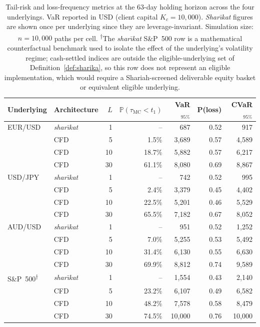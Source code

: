 \documentclass[preprint,12pt,authoryear]{elsarticle}
\newcommand{\PP}{\mathbb{P}}
\theoremstyle{definition}
\begin{document}
\begin{table}[!ht]
\centering
\small
\caption{Tail-risk and loss-frequency metrics at the 63-day
holding horizon across the four underlyings. VaR reported in USD
(client capital $K_c = 10{,}000$). \emph{Shar\={\i}kat} figures
are shown once per underlying since they are leverage-invariant.
Simulation size: $n = 10{,}000$ paths per cell.
\textsuperscript{$\dagger$}The \emph{shar\={\i}kat} S\&P~500 row
is a mathematical counterfactual benchmark used to isolate the
effect of the underlying's volatility regime; cash-settled
indices are outside the eligible-underlying set of
Definition~\ref{def:sharika}, so this row does not represent an
eligible implementation, which would require a
Shariah-screened deliverable equity basket or equivalent
eligible underlying.}
\label{tab:tail-metrics}
\begin{tabular}{@{}llrrrrr@{}}
\toprule
\textbf{Underlying}
    & \textbf{Architecture}
    & $L$
    & $\PP(\tau_{\text{MC}} < t_1)$
    & VaR$_{95\%}$
    & P(loss)
    & CVaR$_{95\%}$ \\
\midrule
EUR/USD & \emph{shar\={\i}kat} & 1  & --      & 687   & 0.52 & 917 \\
        & CFD                  & 5  & 1.5\%   & 3{,}689 & 0.57 & 4{,}589 \\
        & CFD                  & 10 & 18.7\%  & 5{,}882 & 0.57 & 6{,}217 \\
        & CFD                  & 30 & 61.1\%  & 8{,}080 & 0.69 & 8{,}867 \\[3pt]
USD/JPY & \emph{shar\={\i}kat} & 1  & --      & 742   & 0.52 & 995 \\
        & CFD                  & 5  & 2.4\%   & 3{,}379 & 0.45 & 4{,}402 \\
        & CFD                  & 10 & 22.5\%  & 5{,}201 & 0.46 & 5{,}529 \\
        & CFD                  & 30 & 65.5\%  & 7{,}182 & 0.67 & 8{,}052 \\[3pt]
AUD/USD & \emph{shar\={\i}kat} & 1  & --      & 951   & 0.52 & 1{,}252 \\
        & CFD                  & 5  & 7.0\%   & 5{,}255 & 0.53 & 5{,}492 \\
        & CFD                  & 10 & 31.4\%  & 6{,}130 & 0.55 & 6{,}630 \\
        & CFD                  & 30 & 69.9\%  & 8{,}812 & 0.74 & 9{,}589 \\[3pt]
S\&P~500\textsuperscript{$\dagger$} & \emph{shar\={\i}kat} & 1  & --     & 1{,}554 & 0.43 & 2{,}140 \\
         & CFD                 & 5  & 23.2\% & 6{,}107 & 0.49 & 6{,}582 \\
         & CFD                 & 10 & 48.2\% & 7{,}578 & 0.58 & 8{,}479 \\
         & CFD                 & 30 & 74.5\% & 10{,}000 & 0.76 & 10{,}000 \\
\bottomrule
\end{tabular}
\end{table}
\end{document}
